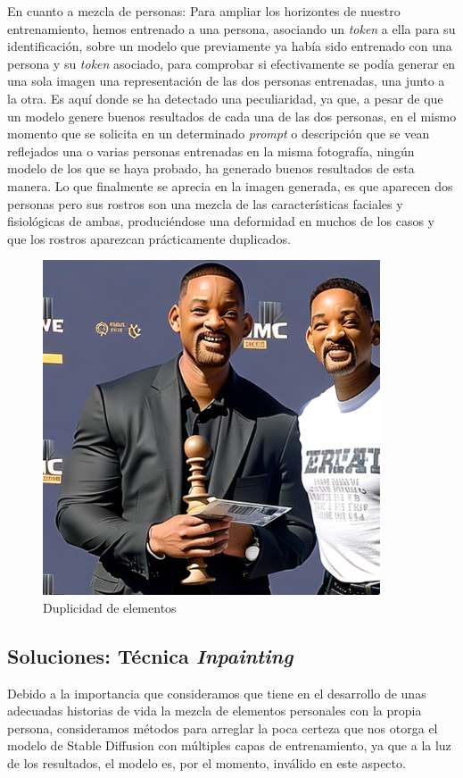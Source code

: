 En cuanto a mezcla de personas: Para ampliar los horizontes de nuestro entrenamiento, hemos entrenado a una persona, asociando un \textit{token} a ella para su identificación, sobre un modelo que previamente ya había sido entrenado con una persona y su \textit{token} asociado, para comprobar si efectivamente se podía generar en una sola imagen una representación de las dos personas entrenadas, una junto a la otra. Es aquí donde se ha detectado una peculiaridad, ya que, a pesar de que un modelo genere buenos resultados de cada una de las dos personas, en el mismo momento que se solicita en un determinado \textit{prompt} o descripción que se vean reflejados una o varias personas entrenadas en la misma fotografía, ningún modelo de los que se haya probado, ha generado buenos resultados de esta manera. Lo que finalmente se aprecia en la imagen generada, es que aparecen dos personas pero sus rostros son una mezcla de las características faciales y fisiológicas de ambas, produciéndose una deformidad en muchos de los casos y que los rostros aparezcan prácticamente duplicados.


\begin{figure}[h]
	\centering
	\includegraphics[width = 0.5
	\textwidth]{Imagenes/Vectorial/duplicidad_will.png}
	\caption{Duplicidad de elementos}
	\label{fig:willpor2}
\end{figure}

\subsection{Soluciones: Técnica \textit{Inpainting}}

Debido a la importancia que consideramos que tiene en el desarrollo de unas adecuadas historias de vida la mezcla de elementos personales con la propia persona, consideramos métodos para arreglar la poca certeza que nos otorga el modelo de Stable Diffusion con múltiples capas de entrenamiento, ya que a la luz de los resultados, el modelo es, por el momento, inválido en este aspecto. \\

